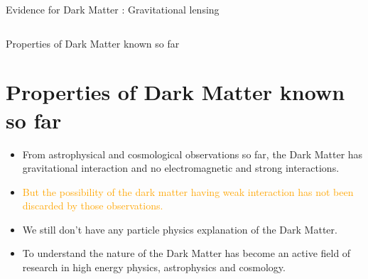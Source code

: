 \documentclass[11pt]{beamer}
\begin{document}
\begin{frame}{Evidence for Dark Matter : Gravitational lensing}
\begin{columns}
\end{columns}
\end{frame}




%
%
%


\begin{frame}{Properties of Dark Matter known so far}

\section{Properties of Dark Matter known so far}

\begin{itemize}


\item From astrophysical and cosmological observations so far, the Dark Matter has gravitational interaction and no electromagnetic and strong interactions.
\vspace{2mm}


\item \textcolor{orange}{But the possibility of the dark matter having weak interaction has not been discarded by those observations.}
\vspace{2mm}
\item We still don't have any particle physics explanation of the Dark Matter.
\vspace{2mm}

\item To understand the nature of the Dark Matter has become an active field of research in high energy physics, astrophysics and cosmology.

\end{itemize}
\end{frame}
\end{document}
